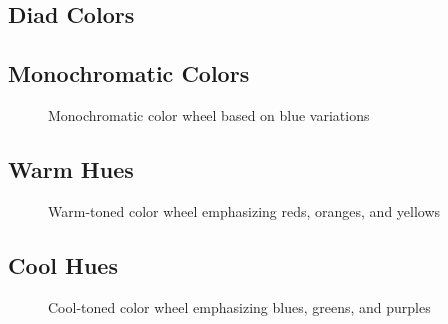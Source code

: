 \subsection{Diad Colors} 

\subsection{Monochromatic Colors}

  \begin{example}
    \begin{figure}[H]
      \centering 
      \caption{Monochromatic color wheel based on blue variations} 
    \end{figure}
  \end{example}

\subsection{Warm Hues} 

  \begin{example}
    \begin{figure}[H]
      \centering 
      \caption{Warm-toned color wheel emphasizing reds, oranges, and yellows} 
    \end{figure}
  \end{example}

\subsection{Cool Hues}

  \begin{example}
    \begin{figure}[H]
      \centering 
      \caption{Cool-toned color wheel emphasizing blues, greens, and purples} 
    \end{figure}
  \end{example}

